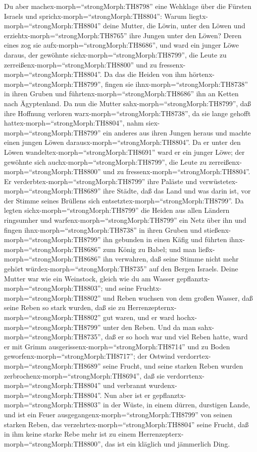  Du aber machex-morph=``strongMorph:TH8798'' eine Wehklage
über die Fürsten Israels  und
sprichx-morph=``strongMorph:TH8804'': Warum
liegtx-morph=``strongMorph:TH8804'' deine Mutter, die Löwin, unter den
Löwen und erziehtx-morph=``strongMorph:TH8765'' ihre Jungen unter den
Löwen?  Deren eines zog sie
aufx-morph=``strongMorph:TH8686'', und ward ein junger Löwe daraus, der
gewöhnte sichx-morph=``strongMorph:TH8799'', die Leute zu
zerreißenx-morph=``strongMorph:TH8800'' und zu
fressenx-morph=``strongMorph:TH8804''.  Da das die Heiden
von ihm hörtenx-morph=``strongMorph:TH8799'', fingen sie
ihnx-morph=``strongMorph:TH8738'' in ihren Gruben und
führtenx-morph=``strongMorph:TH8686'' ihn an Ketten nach Ägyptenland.
 Da nun die Mutter sahx-morph=``strongMorph:TH8799'', daß
ihre Hoffnung verloren warx-morph=``strongMorph:TH8738'', da sie lange
gehofft hattex-morph=``strongMorph:TH8804'', nahm
siex-morph=``strongMorph:TH8799'' ein anderes aus ihren Jungen heraus
und machte einen jungen Löwen darausx-morph=``strongMorph:TH8804''.
 Da er unter den Löwen
wandeltex-morph=``strongMorph:TH8691'' ward er ein junger Löwe; der
gewöhnte sich auchx-morph=``strongMorph:TH8799'', die Leute zu
zerreißenx-morph=``strongMorph:TH8800'' und zu
fressenx-morph=``strongMorph:TH8804''.  Er
verderbtex-morph=``strongMorph:TH8799'' ihre Paläste und
verwüstetex-morph=``strongMorph:TH8689'' ihre Städte, daß das Land und
was darin ist, vor der Stimme seines Brüllens sich
entsetztex-morph=``strongMorph:TH8799''.  Da legten
sichx-morph=``strongMorph:TH8799'' die Heiden aus allen Ländern
ringsumher und warfenx-morph=``strongMorph:TH8799'' ein Netz über ihn
und fingen ihnx-morph=``strongMorph:TH8738'' in ihren Gruben
 und stießenx-morph=``strongMorph:TH8799'' ihn gebunden in
einen Käfig und führten ihnx-morph=``strongMorph:TH8686'' zum König zu
Babel; und man ließx-morph=``strongMorph:TH8686'' ihn verwahren, daß
seine Stimme nicht mehr gehört würdex-morph=``strongMorph:TH8735'' auf
den Bergen Israels.  Deine Mutter war wie ein Weinstock,
gleich wie du am Wasser gepflanztx-morph=``strongMorph:TH8803''; und
seine Fruchtx-morph=``strongMorph:TH8802'' und Reben wuchsen von dem
großen Wasser,  daß seine Reben so stark wurden, daß sie zu
Herrenzepternx-morph=``strongMorph:TH8802'' gut waren, und er ward
hochx-morph=``strongMorph:TH8799'' unter den Reben. Und da man
sahx-morph=``strongMorph:TH8735'', daß er so hoch war und viel Reben
hatte,  ward er mit Grimm
ausgerissenx-morph=``strongMorph:TH8714'' und zu Boden
geworfenx-morph=``strongMorph:TH8717''; der Ostwind
verdorrtex-morph=``strongMorph:TH8689'' seine Frucht, und seine starken
Reben wurden zerbrochenx-morph=``strongMorph:TH8694'', daß sie
verdorrtenx-morph=``strongMorph:TH8804'' und verbrannt
wurdenx-morph=``strongMorph:TH8804''.  Nun aber ist er
gepflanztx-morph=``strongMorph:TH8803'' in der Wüste, in einem dürren,
durstigen Lande,  und ist ein Feuer
ausgegangenx-morph=``strongMorph:TH8799'' von seinen starken Reben, das
verzehrtex-morph=``strongMorph:TH8804'' seine Frucht, daß in ihm keine
starke Rebe mehr ist zu einem
Herrenzepterx-morph=``strongMorph:TH8800'', das ist ein kläglich und
jämmerlich Ding.

